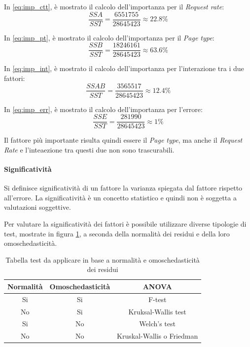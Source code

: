 In \cref {eq:imp_ctt}, è mostrato il calcolo dell'importanza per il \textit{Request rate}:
\begin{equation}
    \frac{SSA}{SST}= \frac{6551755}{28645423} \approx 22.8\% 
    \label{eq:imp_ctt}
\end{equation}

In \cref {eq:imp_pt}, è mostrato il calcolo dell'importanza per il \textit{Page type}:
\begin{equation}
    \frac{SSB}{SST}= \frac{18246161}{28645423}  \approx 63.6\%
    \label{eq:imp_pt}
\end{equation}

In \cref {eq:imp_int}, è mostrato il calcolo dell'importanza per l'interazione tra i due fattori:
\begin{equation}
    \frac{SSAB}{SST} = \frac{3565517}{28645423}  \approx 12.4\%
    \label{eq:imp_int}
\end{equation}

In \cref {eq:imp_err}, è mostrato il calcolo dell'importanza per l'errore:
\begin{equation}
    \frac{SSE}{SST}=\frac{281990}{28645423}  \approx 1\%
    \label{eq:imp_err}
\end{equation}

Il fattore più importante risulta quindi essere il \textit{Page type}, ma anche il \textit{Request Rate} e l'inteaezione tra questi due non sono trascurabili.

\paragraph{Significatività}
Si definisce significatività di un fattore la varianza spiegata dal fattore rispetto all’errore. La significatività è un concetto statistico e quindi non è soggetta a valutazioni soggettive.

Per valutare la significatività dei fattori è possibile utilizzare diverse tipologie di test, mostrate in figura \cref{tab:anova}, a seconda della normalità dei residui e della loro omoschedasticità.

\begin{table}[H]
\centering
    \begin{tabular}{|c|c|c|}
    \hline
    \multicolumn{1}{|c|}{\textbf{Normalità}} &
    \multicolumn{1}{|c|}{\textbf{Omoschedasticità}} &
    \multicolumn{1}{|c|}{\textbf{ANOVA}}
    \tabularnewline \hline

Si & Si & F-test \tabularnewline \hline
No & Si & Kruksal-Wallis test\tabularnewline \hline
Si & No &  Welch’s test \tabularnewline \hline
No & No & Kruskal-Wallis o Friedman \tabularnewline \hline
\end{tabular}
\caption{Tabella test da applicare in base a normalità e omoschedasticità dei residui}
\label{tab:anova}
\end{table}

